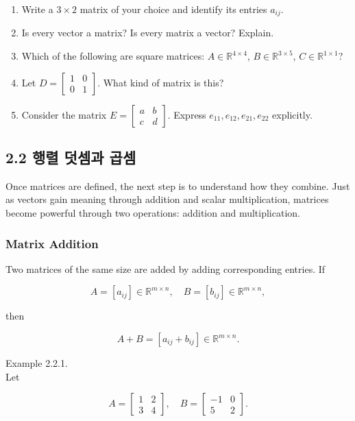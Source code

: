 \documentclass[
  12pt,
  a4paper,
]{article}
\begin{document}
\begin{enumerate}
\def\labelenumi{\arabic{enumi}.}
\item
  Write a \(3 \times 2\) matrix of your choice and identify its entries
  \(a_{ij}\).
\item
  Is every vector a matrix? Is every matrix a vector? Explain.
\item
  Which of the following are square matrices:
  \(A \in \mathbb{R}^{4\times4}\), \(B \in \mathbb{R}^{3\times5}\),
  \(C \in \mathbb{R}^{1\times1}\)?
\item
  Let \(D = \begin{bmatrix} 1 & 0 \\ 0 & 1 \end{bmatrix}\). What kind of
  matrix is this?
\item
  Consider the matrix
  \(E = \begin{bmatrix} a & b \\ c & d \end{bmatrix}\). Express
  \(e_{11}, e_{12}, e_{21}, e_{22}\) explicitly.
\end{enumerate}

\subsection{2.2 행렬 덧셈과
곱셈}\label{22-matrix-addition-and-multiplication}

Once matrices are defined, the next step is to understand how they
combine. Just as vectors gain meaning through addition and scalar
multiplication, matrices become powerful through two operations:
addition and multiplication.

\subsubsection{Matrix Addition}\label{matrix-addition}

Two matrices of the same size are added by adding corresponding entries.
If

\[A = [a_{ij}] \in \mathbb{R}^{m \times n}, \quad
B = [b_{ij}] \in \mathbb{R}^{m \times n},\]

then

\[A + B = [a_{ij} + b_{ij}] \in \mathbb{R}^{m \times n}.\]

Example 2.2.1.\\
Let

\[A = \begin{bmatrix}
1 & 2 \\
3 & 4
\end{bmatrix}, \quad
B = \begin{bmatrix}
-1 & 0 \\
5 & 2
\end{bmatrix}.\]
\end{document}
